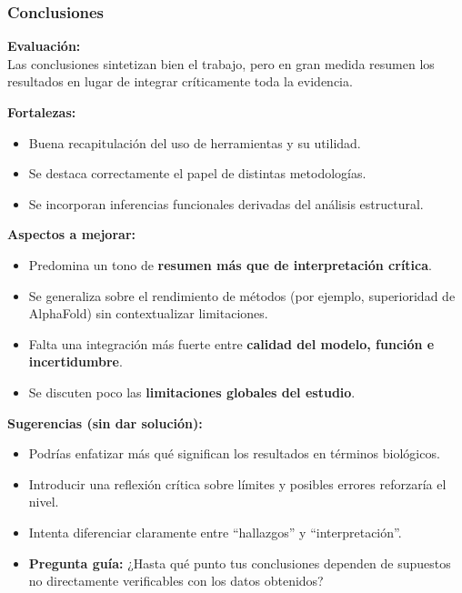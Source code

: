 \documentclass[
  11pt,
  a4paper,
  twoside]{scrreprt}
\begin{document}
\subsubsection{Conclusiones}\label{conclusiones}

\textbf{Evaluación:}\\
Las conclusiones sintetizan bien el trabajo, pero en gran medida resumen
los resultados en lugar de integrar críticamente toda la evidencia.

\textbf{Fortalezas:}

\begin{itemize}
\item
  Buena recapitulación del uso de herramientas y su utilidad.
\item
  Se destaca correctamente el papel de distintas metodologías.
\item
  Se incorporan inferencias funcionales derivadas del análisis
  estructural.
\end{itemize}

\textbf{Aspectos a mejorar:}

\begin{itemize}
\item
  Predomina un tono de \textbf{resumen más que de interpretación
  crítica}.
\item
  Se generaliza sobre el rendimiento de métodos (por ejemplo,
  superioridad de AlphaFold) sin contextualizar limitaciones.
\item
  Falta una integración más fuerte entre \textbf{calidad del modelo,
  función e incertidumbre}.
\item
  Se discuten poco las \textbf{limitaciones globales del estudio}.
\end{itemize}

\textbf{Sugerencias (sin dar solución):}

\begin{itemize}
\item
  Podrías enfatizar más qué significan los resultados en términos
  biológicos.
\item
  Introducir una reflexión crítica sobre límites y posibles errores
  reforzaría el nivel.
\item
  Intenta diferenciar claramente entre ``hallazgos'' y
  ``interpretación''.
\item
  \textbf{Pregunta guía:} ¿Hasta qué punto tus conclusiones dependen de
  supuestos no directamente verificables con los datos obtenidos?
\end{itemize}
\end{document}
